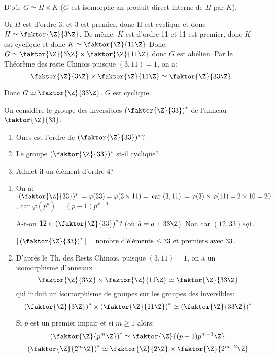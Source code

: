 \begin{exercise}
\begin{enumerate}
		D'où: $G\simeq H\times K$ ($G$ est isomorphe an produit direct interne de $H$ par $K$).
		
		Or $H$ est d'ordre 3, et 3 est premier, donc H est cyclique et donc $H\simeq \faktor{\Z}{3\Z}$.
		De même: $K$ est d'ordre 11 et 11 est premier, donc $K$ est cyclique et donc $K\simeq \faktor{\Z}{11\Z}$
		Donc: $G\simeq \faktor{\Z}{3\Z}\times \faktor{\Z}{11\Z}$ donc $G$ est abélien. 
		Par le Théorème des reste Chinois puisque $(3,11)=1$, on a:
		$$\faktor{\Z}{3\Z}\times\faktor{\Z}{11\Z}\simeq\faktor{\Z}{33\Z}.$$
		
		Donc $G\simeq \faktor{\Z}{33\Z}$. $G$ est cyclique.
	\end{enumerate}
\end{exercise}

\begin{exercise}
	On considère le groupe des inversibles $\left(\faktor{\Z}{33}\right)^{\ast}$ de l'anneau $\faktor{\Z}{33}$.
	\begin{enumerate}
		\item Ones est l'ordre de $(\faktor{\Z}{33})^{\ast}$?
		\item Le groupe $(\faktor{\Z}{33})^{\ast}$ st-il cyclique?
		\item Admet-il un élément d'ordre 4?
	\end{enumerate}
	\begin{enumerate}
		\item On a: $|(\faktor{\Z}{33})^{\ast}|=\varphi(33)=\varphi (3\times 11)=|\text{car $(3,11)$}|=\varphi (3)\times\varphi (11)=2\times 10=20$, car $\varphi(p^k)=(p-1)p^{k-1}$.
		
		
		\begin{remark}
			A-t-on $\overline{12}\in \left(\faktor{\Z}{33}\right)^{\ast}$? (où $\bar{a}=a+33\Z$). Non car $(12, 33) eq 1$.
			
			$|\left(\faktor{\Z}{33}\right)^{\ast}| = \text{nombre d'éléments $\leq 33$ et premiers avec $33$}$.
		\end{remark}
		
		
		\item D'après le Th. des Rests Chinois, puisque $(3,11)=1$, on a un isomorphisme d'anneaux 
		$$\faktor{\Z}{3\Z}\times\faktor{\Z}{11\Z}\simeq\faktor{\Z}{33\Z}$$
		qui induit un isomorphisme de groupes sur les groupes des inversibles:
		$$\left(\faktor{\Z}{3\Z}\right)^{\ast}\times\left(\faktor{\Z}{11\Z}\right)^{\ast}\simeq\left(\faktor{\Z}{33\Z}\right)^{\ast}$$
		
		
\begin{rappel}
Si $p$ est un premier impair et si $m\geq 1$ alors: 
$$\left(\faktor{\Z}{p^m\Z}\right)^{\ast}\simeq\faktor{\Z}{(p-1)p^{m-1}\Z}$$
$$\left(\faktor{\Z}{2^m\Z}\right)^{\ast}\simeq \faktor{\Z}{2\Z}\times \faktor{\Z}{2^{m-2}\Z}$$
\end{rappel}


\end{enumerate}
\end{exercise}
